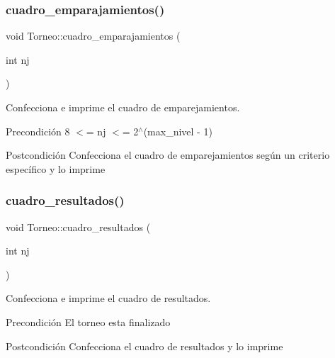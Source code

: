 \subsubsection{\texorpdfstring{cuadro\+\_\+emparajamientos()}{cuadro\_emparajamientos()}}
{\footnotesize\ttfamily void Torneo\+::cuadro\+\_\+emparajamientos (\begin{DoxyParamCaption}\item[{int}]{nj }\end{DoxyParamCaption})}



Confecciona e imprime el cuadro de emparejamientos. 

\begin{DoxyPrecond}{Precondición}
8 $<$= nj $<$= 2$^\wedge$(max\+\_\+nivel -\/ 1) 
\end{DoxyPrecond}
\begin{DoxyPostcond}{Postcondición}
Confecciona el cuadro de emparejamientos según un criterio específico y lo imprime 
\end{DoxyPostcond}
\mbox{\label{class_torneo_ab0e77986392e1b733fae7da2c335208c}} 
\subsubsection{\texorpdfstring{cuadro\+\_\+resultados()}{cuadro\_resultados()}}
{\footnotesize\ttfamily void Torneo\+::cuadro\+\_\+resultados (\begin{DoxyParamCaption}\item[{int}]{nj }\end{DoxyParamCaption})}



Confecciona e imprime el cuadro de resultados. 

\begin{DoxyPrecond}{Precondición}
El torneo esta finalizado 
\end{DoxyPrecond}
\begin{DoxyPostcond}{Postcondición}
Confecciona el cuadro de resultados y lo imprime 
\end{DoxyPostcond}
\mbox{\label{class_torneo_a2fcaaf52de27aca302d1341b70008f1e}} 

